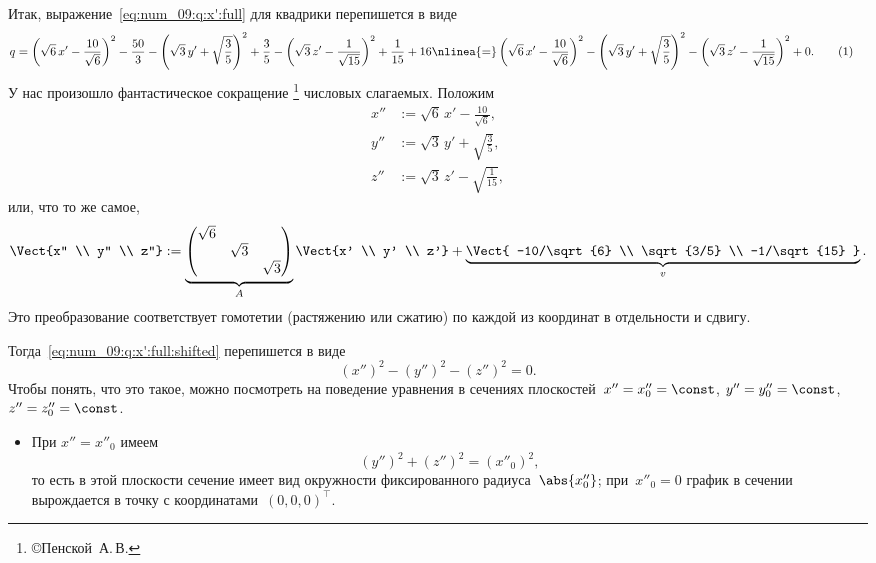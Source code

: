 \begin{solution}
	Итак, выражение~\eqref{eq:num_09:q:x':full} для квадрики перепишется в виде
	\begin{align*}
		q &=
		\left(
			\sqrt{6}\,x'
			-
			\frac{10}{\sqrt{6}}
		\right)^2
		-
		\frac{50}{3}
		-
		\left( 
			\sqrt{3}\,y' +
			\sqrt{\frac{3}{5}}
		\right)^2
		+
		\frac{3}{5}
		-
		\left( 
			\sqrt{3}\,z' - \frac{1}{\sqrt{15}}
		\right)^2
		+
		\frac{1}{15}
		+
		16
		\nlinea{=}
		\left(
			\sqrt{6}\,x'
			-
			\frac{10}{\sqrt{6}}
		\right)^2
		-
		\left( 
			\sqrt{3}\,y' +
			\sqrt{\frac{3}{5}}
		\right)^2
		-
		\left( 
			\sqrt{3}\,z' - \frac{1}{\sqrt{15}}
		\right)^2
		+
		0
		.
		\refstepcounter{equation}
		\tag{\theequation}
		\label{eq:num_09:q:x':full:shifted}
	\end{align*}
	У нас произошло фантастическое сокращение%
	\footnote{
		\copyright Пенской~А.\,В.
	}
	числовых слагаемых.
	Положим
	\begin{align*}
		x'' &:= \sqrt{6}\,x' - \frac{10}{\sqrt{6}},
		\\
		y'' &:= \sqrt{3}\,y' + \sqrt{\frac{3}{5}},
		\\
		z'' &:= \sqrt{3}\,z' - \sqrt{\frac{1}{15}},
	\end{align*}
	или, что то же самое,
	\begin{equation}
		\label{eq:num_09:x'_to_x'':matrix}
		\Vect{x'' \\ y'' \\ z''}
		:=
		\underbrace{
			\begin{pmatrix}
				\sqrt{6} \\
				& \sqrt{3} \\
				&& \sqrt{3}
			\end{pmatrix}
		}_{A}
		\Vect{x' \\ y' \\ z'}
		+
		\underbrace{
			\Vect{
				-10/\sqrt{6} \\ \sqrt{3/5} \\ -1/\sqrt{15}
			}
		}_{v}
		.
	\end{equation}
	Это преобразование соответствует гомотетии (растяжению или сжатию) по каждой из координат в отдельности и сдвигу.

	Тогда~\eqref{eq:num_09:q:x':full:shifted} перепишется в виде
	\[
		(x'')^2 - (y'')^2 - (z'')^2 = 0.
	\]
	Чтобы понять, что это такое, можно посмотреть на поведение уравнения в сечениях плоскостей~$x'' = x''_0 = \const$, $y'' = y''_0 = \const$, $z'' = z''_0 = \const$. 

	\begin{itemize}
		\item При $x'' = x''_0$ имеем
			\[
				(y'')^2 + (z'')^2 = (x''_0)^2,
			\]
			то есть в этой плоскости сечение имеет вид окружности фиксированного радиуса~$\abs{x''_0}$; при~$x''_0 = 0$ график в сечении вырождается в точку с координатами~$(0, 0, 0)^\top$.


\end{itemize}
\end{solution}
